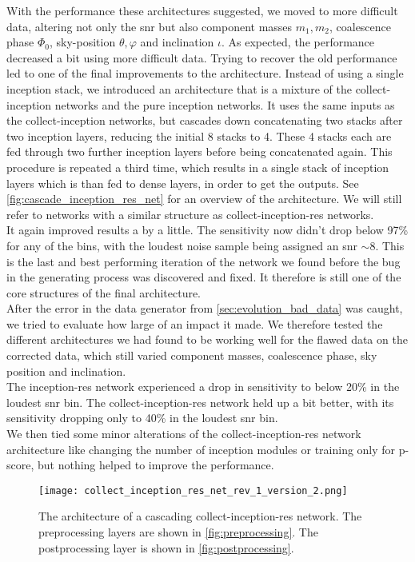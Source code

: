 With the performance these architectures suggested, we moved to more difficult data, altering not only the \gls{snr} but also component masses $m_1, m_2$, coalescence phase $\Phi_0$, sky-position $\theta, \varphi$ and inclination $\iota$. As expected, the performance decreased a bit using more difficult data. Trying to recover the old performance led to one of the final improvements to the architecture. Instead of using a single inception stack, we introduced an architecture that is a mixture of the collect-inception networks and the pure inception networks. It uses the same inputs as the collect-inception networks, but cascades down concatenating two stacks after two inception layers, reducing the initial 8 stacks to 4. These 4 stacks each are fed through two further inception layers before being concatenated again. This procedure is repeated a third time, which results in a single stack of inception layers which is than fed to dense layers, in order to get the outputs. See \autoref{fig:cascade_inception_res_net} for an overview of the architecture. We will still refer to networks with a similar structure as collect-inception-res networks.\\
It again improved results a by a little. The sensitivity now didn't drop below 97\% for any of the bins, with the loudest noise sample being assigned an \gls{snr} $\sim 8$. This is the last and best performing iteration of the network we found before the bug in the generating process was discovered and fixed. It therefore is still one of the core structures of the final architecture.\smallskip\\
After the error in the data generator from \autoref{sec:evolution_bad_data} was caught, we tried to evaluate how large of an impact it made. We therefore tested the different architectures we had found to be working well for the flawed data on the corrected data, which still varied component masses, coalescence phase, sky position and inclination.\\
The inception-res network experienced a drop in sensitivity to below 20\% in the loudest \gls{snr} bin. The collect-inception-res network held up a bit better, with its sensitivity dropping only to 40\% in the loudest \gls{snr} bin.\\
We then tied some minor alterations of the collect-inception-res network architecture like changing the number of inception modules or training only for p-score, but nothing helped to improve the performance.
\begin{figure}
\centering
\texttt{[image: collect\_inception\_res\_net\_rev\_1\_version\_2.png]}
\caption[Cascading architecture of a collect-inception-res network]{The architecture of a cascading collect-inception-res network. The preprocessing layers are shown in \autoref{fig:preprocessing}. The postprocessing layer is shown in \autoref{fig:postprocessing}.}\label{fig:cascade_inception_res_net}
\end{figure}

